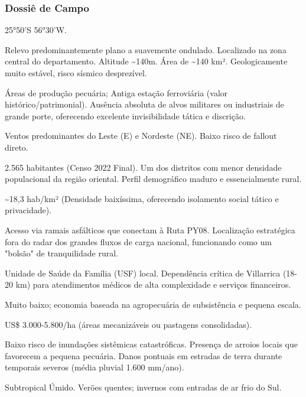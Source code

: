 \subsubsection{Dossiê de Campo}
\begin{description}[style=nextline,leftmargin=0.5cm,font=\bfseries]
\item[Coordenadas]  25°50'S 56°30'W.
\item[Topografia]  Relevo predominantemente plano a suavemente ondulado. Localizado na zona central do departamento. Altitude \textasciitilde 140m. Área de \textasciitilde 140 km². Geologicamente muito estável, risco sísmico desprezível.
\item[Alvos Estratégicos]  Áreas de produção pecuária; Antiga estação ferroviária (valor histórico/\allowbreak patrimonial). Ausência absoluta de alvos militares ou industriais de grande porte, oferecendo excelente invisibilidade tática e discrição.
\item[Fallout]  Ventos predominantes do Leste (E) e Nordeste (NE). Baixo risco de fallout direto.
\item[População]  2.565 habitantes (Censo 2022 Final). Um dos distritos com menor densidade populacional da região oriental. Perfil demográfico maduro e essencialmente rural.
\item[Densidade]  \textasciitilde 18,3 hab/\allowbreak km² (Densidade baixíssima, oferecendo isolamento social tático e privacidade).
\item[Vias de Acesso]  Acesso via ramais asfálticos que conectam à Ruta PY08. Localização estratégica fora do radar dos grandes fluxos de carga nacional, funcionando como um "bolsão" de tranquilidade rural.
\item[Serviços]  Unidade de Saúde da Família (USF) local. Dependência crítica de Villarrica (18-20 km) para atendimentos médicos de alta complexidade e serviços financeiros.
\item[Custo de Vida]  Muito baixo; economia baseada na agropecuária de subsistência e pequena escala.
\item[Preço da Terra]  US\$ 3.000-5.800/\allowbreak ha (áreas mecanizáveis ou pastagens consolidadas).
\item[Hidrologia]  Baixo risco de inundações sistêmicas catastróficas. Presença de arroios locais que favorecem a pequena pecuária. Danos pontuais em estradas de terra durante temporais severos (média pluvial 1.600 mm/\allowbreak ano).
\item[Clima]  Subtropical Úmido. Verões quentes; invernos com entradas de ar frio do Sul.

\end{description}
